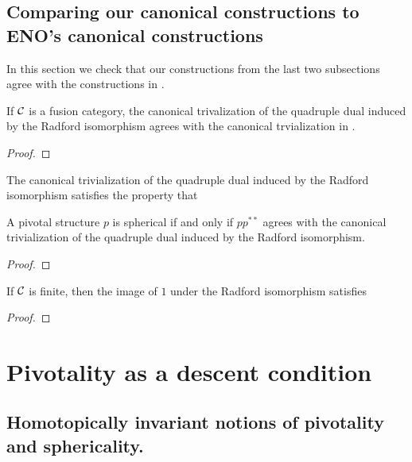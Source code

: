 \documentclass{amsart}
\begin{document}
\subsection{Comparing our canonical constructions to ENO's canonical constructions}

In this section we check that our constructions from the last two subsections agree with the constructions in \cite{MR2097289}.

\begin{proposition}
If $\mathcal C$ is a fusion category, the canonical trivalization of the quadruple dual induced by the Radford isomorphism agrees with the canonical trvialization in \cite{MR2097289}.
\end{proposition}
\begin{proof}
\end{proof}

\begin{corollary}
The canonical trivialization of the quadruple dual induced by the Radford isomorphism satisfies the property that 
\end{corollary}

\begin{lemma}
A pivotal structure $p$ is spherical if and only if $p p^{**}$ agrees with the canonical trivialization of the quadruple dual induced by the Radford isomorphism.
\end{lemma}
\begin{proof}
\end{proof}

\begin{proposition}
If $\mathcal C$ is finite, then the image of $1$ under the Radford isomorphism satisfies 
\end{proposition}
\begin{proof}
\end{proof}


\section{Pivotality as a descent condition} \label{sec-pivot}

\subsection{Homotopically invariant notions of pivotality and sphericality.}
\end{document}
